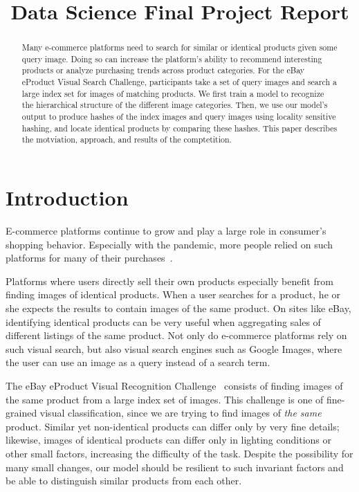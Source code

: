 \documentclass[conference]{IEEEtran}
\begin{document}
\title{Data Science Final Project Report}
\author{
}


\maketitle
\begin{abstract}
	Many e-commerce platforms need to search for similar or identical products
	given some query image.
	Doing so can increase the platform's ability to recommend interesting 
	products or analyze purchasing trends across product categories.
	For the eBay eProduct Visual Search Challenge, participants take a set
	of query images and search a large index set for images of matching products.
	We first train a model to recognize the hierarchical structure of the different
	image categories.
	Then, we use our model's output to produce hashes of the index images
	and query images using locality sensitive hashing, and locate identical products by comparing these hashes.
	This paper describes the motviation, approach, and results of the 
	comptetition.
\end{abstract}

\section{Introduction}
E-commerce platforms continue to grow and play a large role in consumer's
shopping behavior.
Especially with the pandemic, more people relied on such platforms for 
many of their purchases~\cite{jilkova2021digital}.

Platforms where users directly sell their own products especially
benefit from finding images of identical products.
When a user searches for a product, he or she expects the results to contain
images of the same product.
On sites like eBay, identifying identical products can be very useful when 
aggregating sales of different listings of the same product.
Not only do e-commerce platforms rely on such visual search, but also visual
search engines such as Google Images, where the user can use an image as a query
instead of a search term.

The eBay eProduct Visual Recognition Challenge~\cite{jiangbo2021ebay} consists of
finding images of the same product from a large index set of images.
This challenge is one of fine-grained visual classification, since we are trying to 
find images of \emph{the same} product. 
Similar yet non-identical products can differ only by very fine details; likewise,
images of identical products can differ only in lighting conditions or other small
factors, increasing the difficulty of the task.
Despite the possibility for many small changes, our model should be resilient to such 
invariant factors and be able to distinguish similar products from each other.
\end{document}
